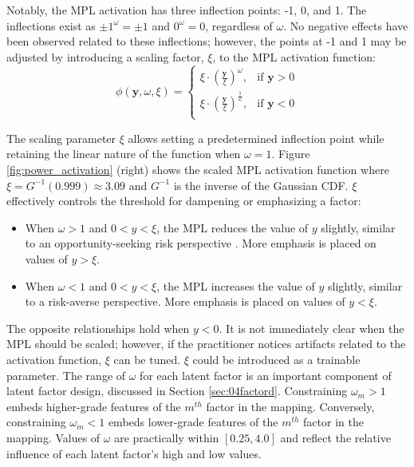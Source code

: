 Notably, the \gls{MPL} activation has three inflection points: -1, 0, and 1. The inflections exist as $\pm 1^{\omega} = \pm 1$ and $0^{\omega} = 0$, regardless of $\omega$. No negative effects have been observed related to these inflections; however, the points at -1 and 1 may be adjusted by introducing a scaling factor, $\xi$, to the \gls{MPL} activation function:
\begin{equation}
    \phi \left( \mathbf{y}, \omega, \xi \right) =
    \begin{cases}
        \xi \cdot \left(\frac{\mathbf{y}}{\xi}\right)^{\omega},           & \text{if $\mathbf{y} > 0$} \\
        \xi \cdot \left(\frac{\mathbf{y}}{\xi}\right)^{\frac{1}{\omega}}, & \text{if $\mathbf{y} < 0$} \\
    \end{cases}
    \label{eq:power_scale}
\end{equation}

The scaling parameter $\xi$ allows setting a predetermined inflection point while retaining the linear nature of the function when $\omega = 1$. Figure \ref{fig:power_activation} (right) shows the scaled \gls{MPL} activation function where $\xi = G^{-1}(0.999) \approx 3.09$ and $G^{-1}$ is the inverse of the Gaussian \gls{CDF}. $\xi$ effectively controls the threshold for dampening or emphasizing a factor:

\begin{itemize}
    \item When $\omega > 1$ and $0 < y < \xi$, the \gls{MPL} reduces the value of $y$ slightly, similar to an opportunity-seeking risk perspective \citep{eidsvik2015value}. More emphasis is placed on values of $y > \xi$.
    \item When $\omega < 1$ and $0 < y < \xi$, the \gls{MPL} increases the value of $y$ slightly, similar to a risk-averse perspective. More emphasis is placed on values of $y < \xi$.
\end{itemize}

The opposite relationships hold when $y < 0$. It is not immediately clear when the \gls{MPL} should be scaled; however, if the practitioner notices artifacts related to the activation function, $\xi$ can be tuned. $\xi$ could be introduced as a trainable parameter. The range of $\omega$ for each latent factor is an important component of latent factor design, discussed in Section \ref{sec:04factord}. Constraining $\omega_{m} > 1$ embeds higher-grade features of the $m^{th}$ factor in the mapping. Conversely, constraining $\omega_{m} < 1$ embeds lower-grade features of the $m^{th}$ factor in the mapping. Values of $\omega$ are practically within $[0.25, 4.0]$ and reflect the relative influence of each latent factor's high and low values.

